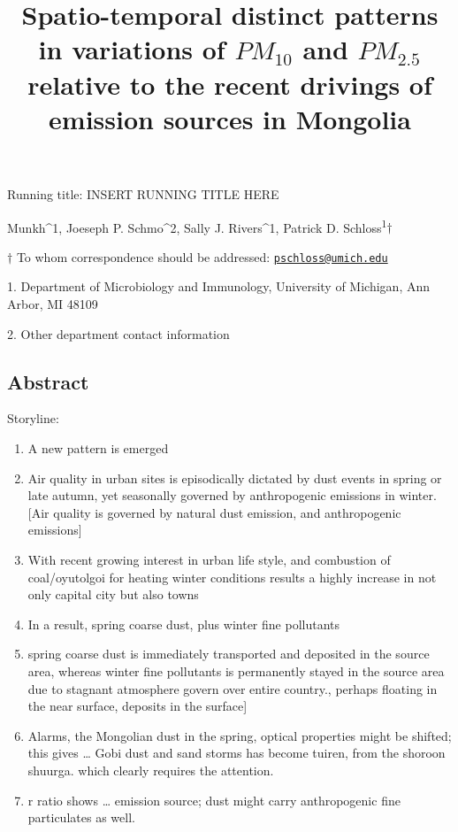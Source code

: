 \documentclass[
  11pt,
]{article}
\title{\textbf{Spatio-temporal distinct patterns in variations of
\(PM_{10}\) and \(PM_{2.5}\) relative to the recent drivings of emission
sources in Mongolia}}
\author{}
\date{\vspace{-2.5em}}
\providecommand{\tightlist}{%
  \setlength{\itemsep}{0pt}\setlength{\parskip}{0pt}}
\begin{document}
\maketitle

\vspace{35mm}

Running title: INSERT RUNNING TITLE HERE

\vspace{35mm}

Munkh\^{}1, Joeseph P. Schmo\^{}2, Sally J. Rivers\^{}1, Patrick D.
Schloss\textsuperscript{1}\(\dagger\)

\vspace{40mm}

\(\dagger\) To whom correspondence should be addressed:
\href{mailto:pschloss@umich.edu}{\nolinkurl{pschloss@umich.edu}}

1. Department of Microbiology and Immunology, University of Michigan,
Ann Arbor, MI 48109

2. Other department contact information

\newpage
\linenumbers

\subsection{Abstract}\label{abstract}

Storyline:

\begin{enumerate}
\def\labelenumi{\arabic{enumi}.}
\tightlist
\item
  A new pattern is emerged
\item
  Air quality in urban sites is episodically dictated by dust events in
  spring or late autumn, yet seasonally governed by anthropogenic
  emissions in winter. {[}Air quality is governed by natural dust
  emission, and anthropogenic emissions{]}
\item
  With recent growing interest in urban life style, and combustion of
  coal/oyutolgoi for heating winter conditions results a highly increase
  in not only capital city but also towns
\item
  In a result, spring coarse dust, plus winter fine pollutants
\item
  spring coarse dust is immediately transported and deposited in the
  source area, whereas winter fine pollutants is permanently stayed in
  the source area due to stagnant atmosphere govern over entire
  country., perhaps floating in the near surface, deposits in the
  surface{]}
\item
  Alarms, the Mongolian dust in the spring, optical properties might be
  shifted; this gives \ldots{} Gobi dust and sand storms has become
  tuiren, from the shoroon shuurga. which clearly requires the
  attention.
\item
  r ratio shows \ldots{} emission source; dust might carry anthropogenic
  fine particulates as well. \newpage
\end{enumerate}
\end{document}

